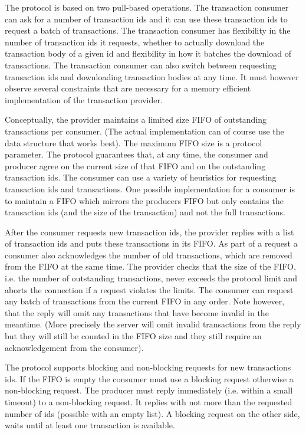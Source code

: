 The protocol is based on two pull-based operations.
The transaction consumer can ask for a number of transaction ids and it can use these
transaction ids to request a batch of transactions.
The transaction consumer has flexibility in the number of transaction ids it requests,
whether to actually download the transaction body of a given id
and flexibility in how it batches the download of transactions.
The transaction consumer can also switch between requesting transaction ids and downloading
transaction bodies at any time.
It must however observe several constraints that are necessary for a memory efficient implementation
of the transaction provider.

Conceptually, the provider maintains a limited size FIFO of outstanding transactions per consumer.
(The actual implementation can of course use the data structure that works best).
The maximum FIFO size is a protocol parameter.
The protocol guarantees that, at any time, the consumer and producer agree on the current size of
that FIFO and on the outstanding transaction ids.
The consumer can use a variety of heuristics for requesting transaction ids and transactions.
One possible implementation for a consumer is to maintain a FIFO which mirrors the producers FIFO
but only contains the transaction ids (and the size of the transaction) and not the full transactions.

After the consumer requests new transaction ids, the provider replies with a list of transaction ids and
puts these transactions in its FIFO.
As part of a request a consumer also acknowledges the number of old transactions,
which are removed from the FIFO at the same time.
The provider checks that the size of the FIFO, i.e. the number of outstanding transactions,
never exceeds the protocol limit and aborts the connection if a request violates the limits.
The consumer can request any batch of transactions from the current FIFO in any order.
Note however, that the reply will omit any transactions that have become invalid in the meantime.
(More precisely the server will omit invalid transactions from the reply but they will still be counted in the FIFO
size and they still require an acknowledgement from the consumer).

The protocol supports blocking and non-blocking requests for new transactions ids.
If the FIFO is empty the consumer must use a blocking request
otherwise a non-blocking request.
The producer must reply immediately (i.e. within a small timeout) to a non-blocking request.
It replies with not more than the requested number of ids (possible with an empty list).
A blocking request on the other side, waits until at least one transaction is available.

